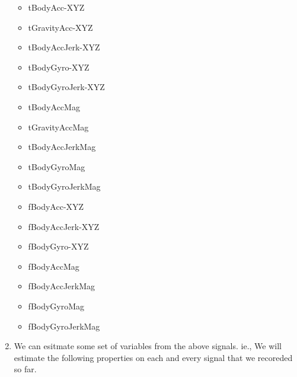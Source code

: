\documentclass[11pt]{article}
\providecommand{\tightlist}{%
      \setlength{\itemsep}{0pt}\setlength{\parskip}{0pt}}
\begin{document}
\begin{enumerate}
  \begin{itemize}
  \tightlist
  \item
    tBodyAcc-XYZ
  \item
    tGravityAcc-XYZ
  \item
    tBodyAccJerk-XYZ
  \item
    tBodyGyro-XYZ
  \item
    tBodyGyroJerk-XYZ
  \item
    tBodyAccMag
  \item
    tGravityAccMag
  \item
    tBodyAccJerkMag
  \item
    tBodyGyroMag
  \item
    tBodyGyroJerkMag
  \item
    fBodyAcc-XYZ
  \item
    fBodyAccJerk-XYZ
  \item
    fBodyGyro-XYZ
  \item
    fBodyAccMag
  \item
    fBodyAccJerkMag
  \item
    fBodyGyroMag
  \item
    fBodyGyroJerkMag
  \end{itemize}
\item
  We can esitmate some set of variables from the above signals. ie., We
  will estimate the following properties on each and every signal that
  we recoreded so far.


\end{enumerate}
\end{document}
